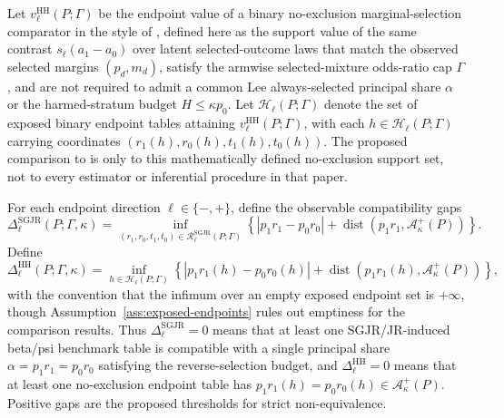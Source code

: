 \documentclass[11pt]{article}
\theoremstyle{definition}
\theoremstyle{plain}
\theoremstyle{remark}
\begin{document}
Let \(v_\ell^{\mathrm{HH}}(P;\Gamma)\) be the endpoint value of a binary no-exclusion marginal-selection comparator in the style of \citet{HonoreHu2020Selection}, defined here as the support value of the same contrast \(s_\ell(a_1-a_0)\) over latent selected-outcome laws that match the observed selected margins \((p_d,m_d)\), satisfy the armwise selected-mixture odds-ratio cap \(\Gamma\), and are not required to admit a common Lee always-selected principal share \(\alpha\) or the harmed-stratum budget \(H\le \kappa p_0\).  Let \(\mathcal H_\ell(P;\Gamma)\) denote the set of exposed binary endpoint tables attaining \(v_\ell^{\mathrm{HH}}(P;\Gamma)\), with each \(h\in\mathcal H_\ell(P;\Gamma)\) carrying coordinates \((r_1(h),r_0(h),t_1(h),t_0(h))\).  The proposed comparison to \citet{HonoreHu2020Selection} is only to this mathematically defined no-exclusion support set, not to every estimator or inferential procedure in that paper.

For each endpoint direction \(\ell\in\{-,+\}\), define the observable compatibility gaps
\[
  \Delta_\ell^{\mathrm{SGJR}}(P;\Gamma,\kappa)=
  \inf_{(r_1,r_0,t_1,t_0)\in\mathcal R_\ell^{\mathrm{SGJR}}(P;\Gamma)}
  \left\{|p_1r_1-p_0r_0|+
  \operatorname{dist}\!\left(p_1r_1,\mathcal A_\kappa^+(P)\right)\right\}.
\]
Define
\[
  \Delta_\ell^{\mathrm{HH}}(P;\Gamma,\kappa)=
  \inf_{h\in\mathcal H_\ell(P;\Gamma)}
  \left\{|p_1r_1(h)-p_0r_0(h)|+
  \operatorname{dist}\!\left(p_1r_1(h),\mathcal A_\kappa^+(P)\right)\right\},
\]
with the convention that the infimum over an empty exposed endpoint set is \(+\infty\), though Assumption~\ref{ass:exposed-endpoints} rules out emptiness for the comparison results.  Thus \(\Delta_\ell^{\mathrm{SGJR}}=0\) means that at least one SGJR/JR-induced beta/psi benchmark table is compatible with a single principal share \(\alpha=p_1r_1=p_0r_0\) satisfying the reverse-selection budget, and \(\Delta_\ell^{\mathrm{HH}}=0\) means that at least one no-exclusion endpoint table has \(p_1r_1(h)=p_0r_0(h)\in\mathcal A_\kappa^+(P)\).  Positive gaps are the proposed thresholds for strict non-equivalence.
\end{document}

